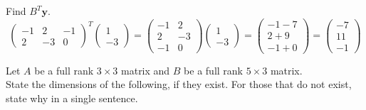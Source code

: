 \documentclass[11pt,a4paper]{article}
\begin{document}
\apart
Find $B^T\textbf{y}$.\\
$$\begin{pmatrix}-1&2&-1\\2&-3&0\end{pmatrix}^T\begin{pmatrix}1\\-3\end{pmatrix}=\begin{pmatrix}
-1&2\\2&-3\\-1&0\end{pmatrix}\begin{pmatrix}1\\-3\end{pmatrix}=\begin{pmatrix}-1-7\\2+9\\-1+0\end{pmatrix}=\begin{pmatrix}-7\\11\\-1\end{pmatrix}$$

\qpart
Let $A$ be a full rank $3\times 3$ matrix and $B$ be a full rank $5\times3$ matrix.\\
State the dimensions of the following, if they exist. For those that do not exist, state why in a single sentence.\\
\end{document}
